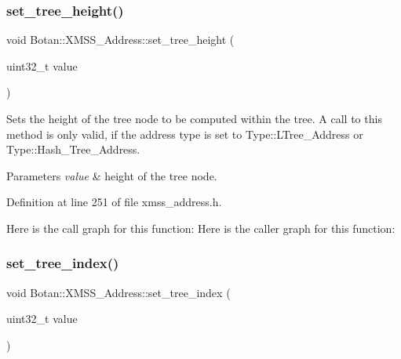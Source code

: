\mbox{\label{class_botan_1_1_x_m_s_s___address_a9bf7df26a0cfc5fee8bb44e22927f61c}} 
\subsubsection{\texorpdfstring{set\+\_\+tree\+\_\+height()}{set\_tree\_height()}}
{\footnotesize\ttfamily void Botan\+::\+X\+M\+S\+S\+\_\+\+Address\+::set\+\_\+tree\+\_\+height (\begin{DoxyParamCaption}\item[{uint32\+\_\+t}]{value }\end{DoxyParamCaption})\hspace{0.3cm}{\ttfamily [inline]}}

Sets the height of the tree node to be computed within the tree. A call to this method is only valid, if the address type is set to Type\+::\+L\+Tree\+\_\+\+Address or Type\+::\+Hash\+\_\+\+Tree\+\_\+\+Address.


\begin{DoxyParams}{Parameters}
{\em value} & height of the tree node. \\
\hline
\end{DoxyParams}


Definition at line 251 of file xmss\+\_\+address.\+h.

Here is the call graph for this function\+:
Here is the caller graph for this function\+:
\mbox{\label{class_botan_1_1_x_m_s_s___address_a9e084bac434f5bca79368d145c4ac991}} 
\subsubsection{\texorpdfstring{set\+\_\+tree\+\_\+index()}{set\_tree\_index()}}
{\footnotesize\ttfamily void Botan\+::\+X\+M\+S\+S\+\_\+\+Address\+::set\+\_\+tree\+\_\+index (\begin{DoxyParamCaption}\item[{uint32\+\_\+t}]{value }\end{DoxyParamCaption})\hspace{0.3cm}{\ttfamily [inline]}}

